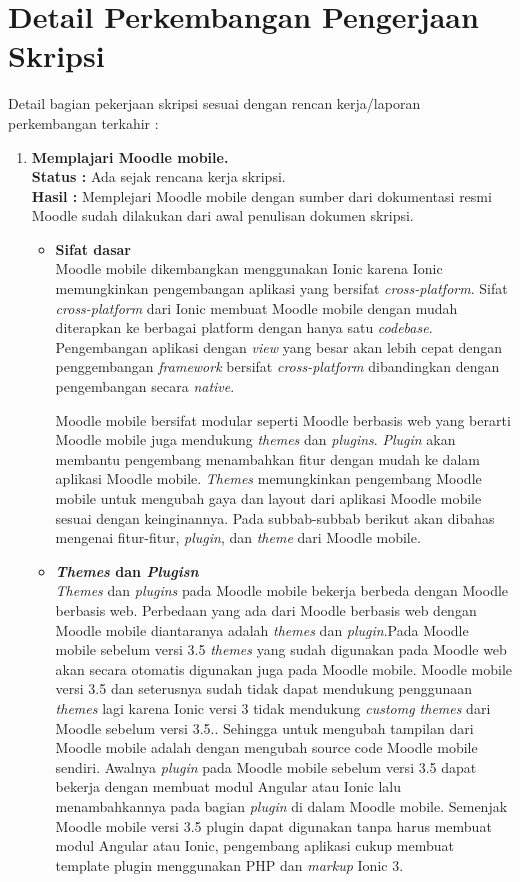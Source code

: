 \documentclass[a4paper,twoside]{article}
\begin{document}
\section{Detail Perkembangan Pengerjaan Skripsi}
Detail bagian pekerjaan skripsi sesuai dengan rencan kerja/laporan perkembangan terkahir :
	\begin{enumerate}
		\item \textbf{Memplajari Moodle mobile.}\\
		{\bf Status :} Ada sejak rencana kerja skripsi.\\
		{\bf Hasil :} Memplejari Moodle mobile dengan sumber dari dokumentasi resmi Moodle sudah dilakukan dari awal penulisan dokumen skripsi. 
\begin{itemize}
\item \textbf{Sifat dasar} \\
Moodle mobile dikembangkan menggunakan Ionic karena Ionic memungkinkan pengembangan aplikasi yang bersifat \textit{cross-platform}. Sifat \textit{cross-platform} dari Ionic membuat Moodle mobile dengan mudah diterapkan ke berbagai platform dengan hanya satu \textit{codebase}. Pengembangan aplikasi dengan \textit{view} yang besar akan lebih cepat dengan penggembangan \textit{framework} bersifat \textit{cross-platform} dibandingkan dengan pengembangan secara \textit{native}. 

Moodle mobile bersifat modular seperti Moodle berbasis web yang berarti Moodle mobile juga mendukung \textit{themes} dan \textit{plugins}. \textit{Plugin} akan membantu pengembang menambahkan fitur dengan mudah ke dalam aplikasi Moodle mobile. \textit{Themes} memungkinkan pengembang Moodle mobile untuk mengubah gaya dan layout dari aplikasi Moodle mobile sesuai dengan keinginannya. Pada subbab-subbab berikut akan dibahas mengenai fitur-fitur, \textit{plugin}, dan \textit{theme} dari Moodle mobile.

\item \textbf{\textit{Themes} dan \textit{Plugisn}} \\
\textit{Themes} dan \textit{plugins} pada Moodle mobile bekerja berbeda dengan Moodle berbasis web. Perbedaan yang ada dari Moodle berbasis web dengan Moodle mobile diantaranya adalah \textit{themes} dan \textit{plugin}.Pada Moodle mobile sebelum versi 3.5 \textit{themes} yang sudah digunakan pada Moodle web akan secara otomatis digunakan juga pada Moodle mobile. Moodle mobile versi 3.5 dan seterusnya sudah tidak dapat mendukung penggunaan \textit{themes} lagi karena Ionic versi 3 tidak mendukung \textit{customg themes} dari Moodle sebelum versi 3.5.. Sehingga untuk mengubah tampilan dari Moodle mobile adalah dengan mengubah source code Moodle mobile sendiri. Awalnya \textit{plugin} pada Moodle mobile sebelum versi 3.5 dapat bekerja dengan membuat modul Angular atau Ionic lalu menambahkannya pada bagian \textit{plugin} di dalam Moodle mobile. Semenjak Moodle mobile versi 3.5 plugin dapat digunakan tanpa harus membuat modul Angular atau Ionic, pengembang aplikasi cukup membuat template plugin menggunakan PHP dan \textit{markup} Ionic 3.


\end{itemize}
\end{enumerate}
\end{document}
